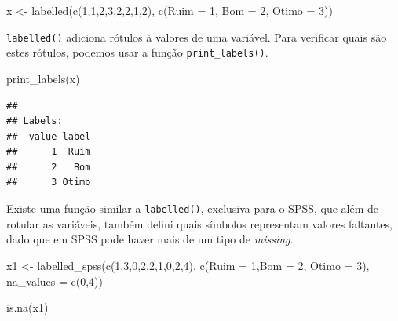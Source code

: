 \documentclass[
]{book}
\newenvironment{Shaded}{\begin{snugshade}}{\end{snugshade}}
\newcommand{\AttributeTok}[1]{\textcolor[rgb]{0.77,0.63,0.00}{#1}}
\newcommand{\DecValTok}[1]{\textcolor[rgb]{0.00,0.00,0.81}{#1}}
\newcommand{\FunctionTok}[1]{\textcolor[rgb]{0.00,0.00,0.00}{#1}}
\newcommand{\NormalTok}[1]{#1}
\newcommand{\OtherTok}[1]{\textcolor[rgb]{0.56,0.35,0.01}{#1}}
\begin{document}
\begin{Shaded}
\begin{Highlighting}[]
\NormalTok{x }\OtherTok{\textless{}{-}} \FunctionTok{labelled}\NormalTok{(}\FunctionTok{c}\NormalTok{(}\DecValTok{1}\NormalTok{,}\DecValTok{1}\NormalTok{,}\DecValTok{2}\NormalTok{,}\DecValTok{3}\NormalTok{,}\DecValTok{2}\NormalTok{,}\DecValTok{2}\NormalTok{,}\DecValTok{1}\NormalTok{,}\DecValTok{2}\NormalTok{), }\FunctionTok{c}\NormalTok{(}\AttributeTok{Ruim =} \DecValTok{1}\NormalTok{, }\AttributeTok{Bom =} \DecValTok{2}\NormalTok{, }\AttributeTok{Otimo =} \DecValTok{3}\NormalTok{))}
\end{Highlighting}
\end{Shaded}

\texttt{labelled()} adiciona rótulos à valores de uma variável. Para verificar quais são estes rótulos, podemos usar a função \texttt{print\_labels()}.

\begin{Shaded}
\begin{Highlighting}[]
\FunctionTok{print\_labels}\NormalTok{(x)}
\end{Highlighting}
\end{Shaded}

\begin{verbatim}
## 
## Labels:
##  value label
##      1  Ruim
##      2   Bom
##      3 Otimo
\end{verbatim}

Existe uma função similar a \texttt{labelled()}, exclusiva para o SPSS, que além de rotular as variáveis, também defini quais símbolos representam valores faltantes, dado que em SPSS pode haver mais de um tipo de \emph{missing}.

\begin{Shaded}
\begin{Highlighting}[]
\NormalTok{x1 }\OtherTok{\textless{}{-}} \FunctionTok{labelled\_spss}\NormalTok{(}\FunctionTok{c}\NormalTok{(}\DecValTok{1}\NormalTok{,}\DecValTok{3}\NormalTok{,}\DecValTok{0}\NormalTok{,}\DecValTok{2}\NormalTok{,}\DecValTok{2}\NormalTok{,}\DecValTok{1}\NormalTok{,}\DecValTok{0}\NormalTok{,}\DecValTok{2}\NormalTok{,}\DecValTok{4}\NormalTok{), }\FunctionTok{c}\NormalTok{(}\AttributeTok{Ruim =} \DecValTok{1}\NormalTok{,}\AttributeTok{Bom =} \DecValTok{2}\NormalTok{, }\AttributeTok{Otimo =} \DecValTok{3}\NormalTok{), }\AttributeTok{na\_values =} \FunctionTok{c}\NormalTok{(}\DecValTok{0}\NormalTok{,}\DecValTok{4}\NormalTok{))}
    
\FunctionTok{is.na}\NormalTok{(x1)}
\end{Highlighting}
\end{Shaded}
\end{document}

